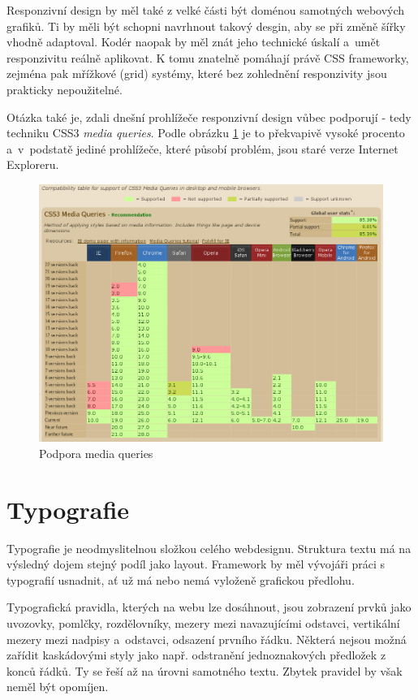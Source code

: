 \documentclass[thesis=B,czech]{FITthesis}[2012/06/26]
\begin{document}
Responzivní design by měl také z velké části být doménou samotných webových grafiků. Ti by měli být schopni navrhnout takový desgin, aby se při změně šířky vhodně adaptoval. Kodér naopak by měl znát jeho technické úskalí a~umět responzivitu reálně aplikovat. K tomu znatelně pomáhají právě CSS frameworky, zejména pak mřížkové (grid) systémy, které bez zohlednění responzivity jsou prakticky nepoužitelné\cite{dev}\cite{dev2}.

Otázka také je, zdali dnešní prohlížeče responzivní design vůbec podporují - tedy techniku CSS3 \textit{media queries}. Podle obrázku \ref{imgMQ} je to překvapivě vysoké procento a~v~podstatě jediné prohlížeče, které působí problém, jsou staré verze Internet Exploreru\cite{mqsup}. 

\begin{figure}[h]
	\begin{center}
	\includegraphics[scale=0.55]{images/image20.png}
	\end{center}
	\caption{Podpora media queries}
	\label{imgMQ}
\end{figure}


\newpage
\section{Typografie}


Typografie je neodmyslitelnou složkou celého webdesignu. Struktura textu má na výsledný dojem stejný podíl jako layout. Framework by měl vývojáři práci s typografií usnadnit, ať už má nebo nemá vyloženě grafickou předlohu.

Typografická pravidla, kterých na webu lze dosáhnout, jsou zobrazení prvků jako uvozovky, pomlčky, rozdělovníky, mezery mezi navazujícími odstavci, vertikální mezery mezi nadpisy a~odstavci, odsazení prvního řádku. Některá nejsou možná zařídit kaskádovými styly jako např. odstranění jednoznakových předložek z konců řádků. Ty se řeší až na úrovni samotného textu. Zbytek pravidel by však neměl být opomíjen.
\end{document}
